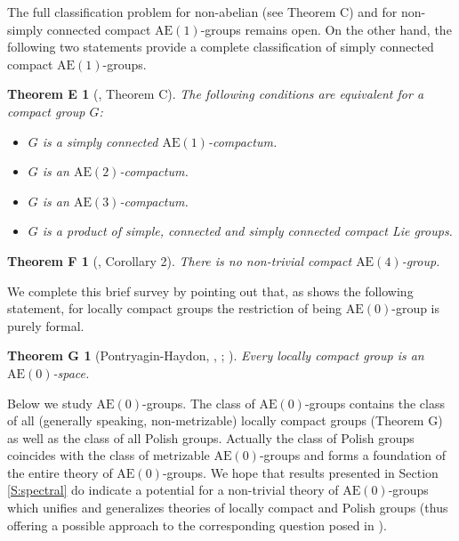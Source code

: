 \documentclass[12pt,draft]{amsart}
\theoremstyle{plain}
\newtheorem*{E}{Theorem E}
\newtheorem*{F}{Theorem F}
\newtheorem*{G}{Theorem G}
\theoremstyle{definition}
\numberwithin{equation}{section}
\begin{document}
The full classification problem for 
non-abelian (see Theorem C) and for non-simply connected
compact $\text{AE}(1)$-groups remains open. On the other hand,
the following two statements provide a complete classification of
simply connected compact $\text{AE}(1)$-groups.

\begin{E}[\cite{chi972}, Theorem C]\label{T:E}
The following conditions are equivalent for a compact group $G$:
\begin{itemize}
\item[(a)]
$G$ is a simply connected $\text{AE}(1)$-compactum.
\item[(b)]
$G$ is an $\text{AE}(2)$-compactum.
\item[(c)]
$G$ is an $\text{AE}(3)$-compactum.
\item[(d)]
$G$ is a product of simple, connected and simply connected
compact Lie groups.
\end{itemize}
\end{E}



\begin{F}[\cite{chi972}, Corollary 2]\label{T:F}
There is no non-trivial compact
$\text{AE}(4)$-group.
\end{F}


We complete this brief survey by pointing out that, as shows the
following statement,
for locally compact 
groups the restriction of being $\text{AE}(0)$-group is purely formal.

\begin{G}[Pontryagin-Haydon, \cite{pont46},
\cite{hay74}; \cite{chibook96}]\label{T:G}
Every locally compact group is an $\text{AE}(0)$-space.
\end{G}

Below we study $\text{AE}(0)$-groups. 
The class of $\text{AE}(0)$-groups contains the class of all
(generally speaking, non-metrizable)
locally compact groups (Theorem G) as well as the class of
all Polish groups. Actually the class of Polish groups coincides
with the class of metrizable $\text{AE}(0)$-groups and forms a
foundation of the entire theory of $\text{AE}(0)$-groups. We 
hope that results presented in Section \ref{S:spectral} do
indicate a potential for a non-trivial
theory of $\text{AE}(0)$-groups which unifies and generalizes
theories of locally compact and Polish groups (thus offering a
possible approach to the
corresponding question posed in \cite{pest99}).
\end{document}
